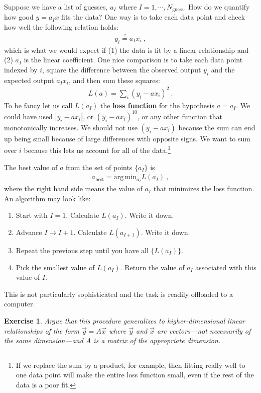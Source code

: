 \documentclass[12pt]{article}
\newtheorem{exercise}{Exercise}[section]
\begin{document}
Suppose we have a list of guesses, $a_I$ where $I=1, \cdots, N_\text{guess}$. How do we quantify how good $y=a_I x$ fits the data? One way is to take each data point and check how well the following relation holds:
\begin{align}
    y_i \stackrel{?}{=} a_I x_i \ ,
\end{align}
which is what we would expect if (1) the data is fit by a linear relationship and (2) $a_I$ is the linear coefficient. One nice comparison is to take each data point indexed by $i$, square the difference between the observed output $y_i$ and the expected output $a_I x_i$, and then sum these squares:
\begin{align}
    L(a) = \sum_i \left(y_i - a x_i\right)^2 \ .
\end{align}
To be fancy let us call $L(a_I)$ the \textbf{loss function} for the hypothesis $a=a_I$.  We could have used $|y_i - a x_i|$, or $\left(y_i - a x_i\right)^{10}$, or any other function that monotonically increases. We should not use $(y_i-a x_i)$ because the sum can end up being small because of large differences with opposite signs. We want to sum over $i$ because this lets us account for all of the data.\footnote{If we replace the sum by a product, for example, then fitting really well to one data point will make the entire loss function small, even if the rest of the data is a poor fit.}

The best value of $a$ from the set of points $\{a_I\}$ is
\begin{align}
    a_\text{best} = \text{arg}\,\text{min}_{a_I} L(a_I) \ ,
\end{align}
where the right hand side means the value of $a_I$ that minimizes the loss function. An algorithm may look like:
\begin{enumerate}
    \item Start with $I=1$. Calculate $L(a_I)$. Write it down.
    \item Advance $I\to I+1$. Calculate $L(a_{I+1})$. Write it down.
    \item Repeat the previous step until you have all $\{L(a_I)\}$.
    \item Pick the smallest value of $L(a_I)$. Return the value of $a_I$ associated with this value of $I$. 
\end{enumerate}
This is not particularly sophisticated and the task is readily offloaded to a computer.

\begin{exercise}
Argue that this procedure generalizes to higher-dimensional linear relationships of the form $\vec{y} = A \vec{x}$ where $\vec{y}$ and $\vec{x}$ are vectors---not necessarily of the same dimension---and $A$ is a matrix of the appropriate dimension. 
\end{exercise}
\end{document}
